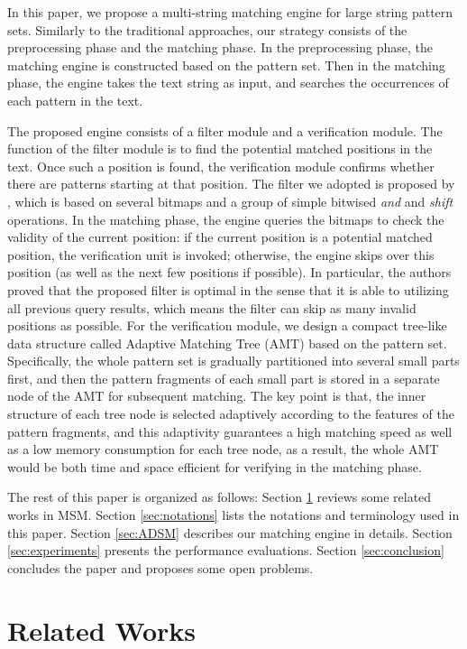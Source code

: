 \documentclass{article}
\begin{document}
In this paper, we propose a multi-string matching engine for large
string pattern sets. Similarly to the traditional approaches, our
strategy consists of the preprocessing phase and the matching
phase. In the preprocessing phase, the matching engine is constructed
based on the pattern set. Then in the matching phase, the engine takes
the text string as input, and searches the occurrences of each
pattern in the text.

The proposed engine consists of a filter module and a verification
module. The function of the filter module is to find the potential matched
positions in the text. Once such a position is found, the verification
module confirms whether there are patterns starting at that
position. The filter we adopted is proposed by \cite{Lee2013}, which
is based on several bitmaps and a group of simple bitwised \emph{and}
and \emph{shift} operations. In the matching phase, the engine queries
the bitmaps to check the validity of the current position: if the
current position is a potential matched position, the verification
unit is invoked; otherwise, the engine skips over this position (as
well as the next few positions if possible). In particular, the
authors proved that the proposed filter is optimal in the sense that
it is able to utilizing all previous query results, which means the
filter can skip as many invalid positions as possible. For the
verification module, we design a compact tree-like data structure called
Adaptive Matching Tree (\textsf{AMT}) based on the pattern
set. Specifically, the whole pattern set is gradually partitioned into
several small parts first, and then the pattern fragments of each
small part is stored in a separate node of the AMT for subsequent
matching. The key point is that, the inner structure of each tree node
is selected adaptively according to the features of the pattern
fragments, and this adaptivity guarantees a high matching speed as
well as a low memory consumption for each tree node, as a result, the
whole AMT would be both time and space efficient for verifying in the
matching phase.

The rest of this paper is organized as follows: Section
\ref{sec:related works} reviews some related works in MSM. Section
\ref{sec:notations} lists the notations and terminology used in this
paper. Section \ref{sec:ADSM} describes our matching engine in
details. Section \ref{sec:experiments} presents the performance
evaluations. Section \ref{sec:conclusion} concludes the paper and
proposes some open problems.

\section{Related Works}
\label{sec:related works}
\end{document}
